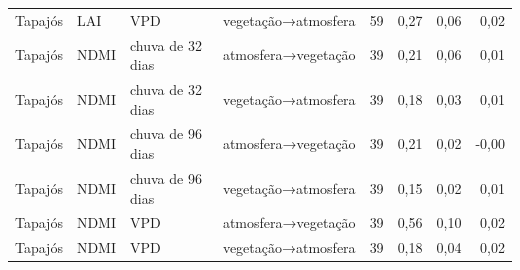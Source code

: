 \begin{table}
\begin{tabular}{llllrrrr}
Tapajós & LAI & VPD & vegetação→atmosfera & 59 & 0,27 & 0,06 & 0,02 \\
Tapajós & NDMI & chuva de 32 dias & atmosfera→vegetação & 39 & 0,21 & 0,06 & 0,01 \\
Tapajós & NDMI & chuva de 32 dias & vegetação→atmosfera & 39 & 0,18 & 0,03 & 0,01 \\
Tapajós & NDMI & chuva de 96 dias & atmosfera→vegetação & 39 & 0,21 & 0,02 & -0,00 \\
Tapajós & NDMI & chuva de 96 dias & vegetação→atmosfera & 39 & 0,15 & 0,02 & 0,01 \\
Tapajós & NDMI & VPD & atmosfera→vegetação & 39 & 0,56 & 0,10 & 0,02 \\
Tapajós & NDMI & VPD & vegetação→atmosfera & 39 & 0,18 & 0,04 & 0,02 \\
\bottomrule
\end{tabular}
\end{table}
